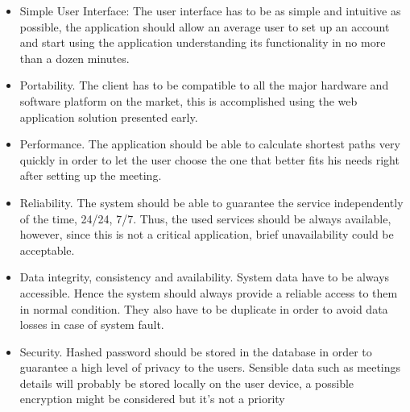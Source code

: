 \begin{itemize}
\item Simple User Interface:
The user interface has to be as simple and intuitive as possible, the application should allow an average user to set up an account and start using the application understanding its functionality in no more than a dozen minutes.

\item Portability. The client has to be compatible to all the major hardware and software platform on the market, this is accomplished using the web application solution presented early.

\item Performance. The application should be able to calculate shortest paths very quickly in order to let the user choose the one that better fits his needs right after setting up the meeting.

\item Reliability. The system should be able to guarantee the service independently of the time, 24/24, 7/7. Thus, the used services should be always available, however, since this is not a critical application, brief unavailability could be acceptable.

\item Data integrity, consistency and availability. System data have to be always accessible. Hence the system should always provide a reliable access to them in normal condition. They also have to be duplicate in order to avoid data losses in case of system fault. 

\item Security. Hashed password should be stored in the database in order to guarantee a high level of privacy to the users. Sensible data such as meetings details will probably be stored locally on the user device, a possible encryption might be considered but it's not a priority
\end{itemize}
